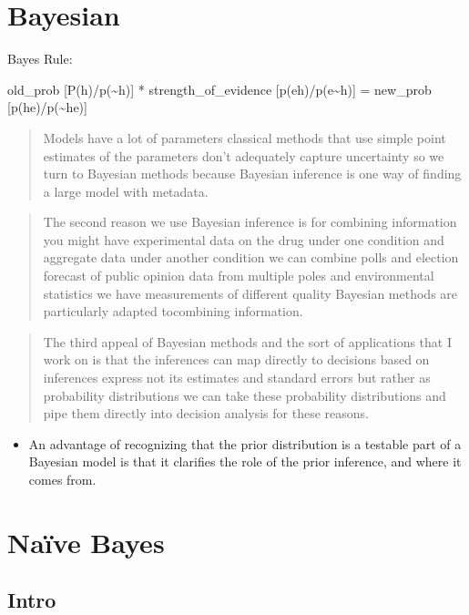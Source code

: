 \documentclass[]{book}
\providecommand{\tightlist}{%
  \setlength{\itemsep}{0pt}\setlength{\parskip}{0pt}}
\theoremstyle{definition}
\theoremstyle{definition}
\theoremstyle{definition}
\theoremstyle{remark}
\begin{document}
\section{Bayesian}\label{bayesian}

Bayes Rule:

old\_prob {[}P(h)/p(\textasciitilde{}h){]} * strength\_of\_evidence
{[}p(e\textbar{}h)/p(e\textbar{}\textasciitilde{}h){]} = new\_prob
{[}p(h\textbar{}e)/p(\textasciitilde{}h\textbar{}e){]}

\begin{quote}
Models have a lot of parameters classical methods that use simple point
estimates of the parameters don't adequately capture uncertainty so we
turn to Bayesian methods because Bayesian inference is one way of
finding a large model with metadata.
\end{quote}

\begin{quote}
The second reason we use Bayesian inference is for combining information
you might have experimental data on the drug under one condition and
aggregate data under another condition we can combine polls and election
forecast of public opinion data from multiple poles and environmental
statistics we have measurements of different quality Bayesian methods
are particularly adapted tocombining information.
\end{quote}

\begin{quote}
The third appeal of Bayesian methods and the sort of applications that I
work on is that the inferences can map directly to decisions based on
inferences express not its estimates and standard errors but rather as
probability distributions we can take these probability distributions
and pipe them directly into decision analysis for these reasons.
\end{quote}

\begin{itemize}
\tightlist
\item
  An advantage of recognizing that the prior distribution is a testable
  part of a Bayesian model is that it clarifies the role of the prior
  inference, and where it comes from.
\end{itemize}

\section{Naïve Bayes}\label{naive-bayes}

\subsection{Intro}\label{intro}
\end{document}
